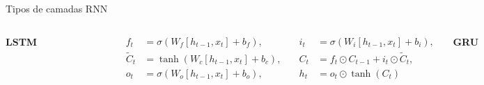 \documentclass{beamer}
\begin{document}
\begin{frame}{Tipos de camadas RNN}
	\begin{columns}[t]
		\begin{center}
			\textbf{LSTM}
		\end{center}

		\begin{figure}[h]
			\centering
			\includegraphics[width=0.33\textwidth]{assets/colah-LSTM-layer.png}
		\end{figure}

		\tiny
		\[
		\begin{alignedat}{2}
			f_t & = \sigma(W_f [h_{t-1}, x_t] + b_f), \quad & 
			i_t & = \sigma(W_i [h_{t-1}, x_t] + b_i), \\
			\tilde{C}_t & = \tanh(W_c [h_{t-1}, x_t] + b_c), \quad &
			C_t & = f_t \odot C_{t-1} + i_t \odot \tilde{C}_t, \\
			o_t & = \sigma(W_o [h_{t-1}, x_t] + b_o), \quad &
			h_t & = o_t \odot \tanh(C_t)
		\end{alignedat}
		\]
		\begin{center}
			\textbf{GRU}
		\end{center}

		\begin{figure}[h]
			\centering
			\includegraphics[width=0.33\textwidth]{assets/colah-GRU-layer.png}
		\end{figure}

		\tiny\[
			\begin{aligned}
				z_t         & = \sigma(W_z \cdot \left[h_{t-1}, x_t \right])        \\
				r_t         & = \sigma(W_r \cdot \left[h_{t-1}, x_t \right])        \\
				\tilde{h}_t & = \tanh(W \cdot \left[r_t \odot h_{t-1}, x_t \right]) \\
				h_t         & = (1 - z_t) \odot h_{t-1} + z_t \odot \tilde{h}_t
			\end{aligned}
		\]

	\end{columns}
\end{frame}
\end{document}
